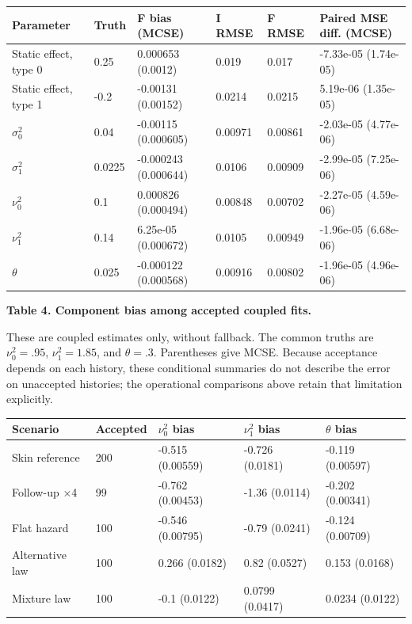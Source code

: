 \documentclass[11pt]{article}
\begin{document}
{\footnotesize\setlength{\tabcolsep}{4pt}
\begin{longtable}{llllll}
\toprule
\textbf{Parameter} & \textbf{Truth} & \textbf{F bias (MCSE)} & \textbf{I RMSE} & \textbf{F RMSE} & \textbf{Paired MSE diff. (MCSE)} \\
\midrule
\endhead
\bottomrule
\endlastfoot
Static effect, type 0 & 0.25 & 0.000653 (0.0012) & 0.019 & 0.017 & -7.33e-05 (1.74e-05) \\
Static effect, type 1 & -0.2 & -0.00131 (0.00152) & 0.0214 & 0.0215 & 5.19e-06 (1.35e-05) \\
\(\sigma_0^2\) & 0.04 & -0.00115 (0.000605) & 0.00971 & 0.00861 & -2.03e-05 (4.77e-06) \\
\(\sigma_1^2\) & 0.0225 & -0.000243 (0.000644) & 0.0106 & 0.00909 & -2.99e-05 (7.25e-06) \\
\(\nu_0^2\) & 0.1 & 0.000826 (0.000494) & 0.00848 & 0.00702 & -2.27e-05 (4.59e-06) \\
\(\nu_1^2\) & 0.14 & 6.25e-05 (0.000672) & 0.0105 & 0.00949 & -1.96e-05 (6.68e-06) \\
\(\theta\) & 0.025 & -0.000122 (0.000568) & 0.00916 & 0.00802 & -1.96e-05 (4.96e-06) \\
\end{longtable}}

\label{tab:4}
\textbf{Table 4. Component bias among accepted coupled fits.}

These are coupled estimates only, without fallback. The common truths are \(\nu_0^2=.95\), \(\nu_1^2=1.85\), and \(\theta=.3\). Parentheses give MCSE. Because acceptance depends on each history, these conditional summaries do not describe the error on unaccepted histories; the operational comparisons above retain that limitation explicitly.

{
\begin{longtable}{lllll}
\toprule
\textbf{Scenario} & \textbf{Accepted} & \textbf{\(\nu_0^2\) bias} & \textbf{\(\nu_1^2\) bias} & \textbf{\(\theta\) bias} \\
\midrule
\endhead
\bottomrule
\endlastfoot
Skin reference & 200 & -0.515 (0.00559) & -0.726 (0.0181) & -0.119 (0.00597) \\
Follow-up $\times$4 & 99 & -0.762 (0.00453) & -1.36 (0.0114) & -0.202 (0.00341) \\
Flat hazard & 100 & -0.546 (0.00795) & -0.79 (0.0241) & -0.124 (0.00709) \\
Alternative law & 100 & 0.266 (0.0182) & 0.82 (0.0527) & 0.153 (0.0168) \\
Mixture law & 100 & -0.1 (0.0122) & 0.0799 (0.0417) & 0.0234 (0.0122) \\
\end{longtable}}
\end{document}
